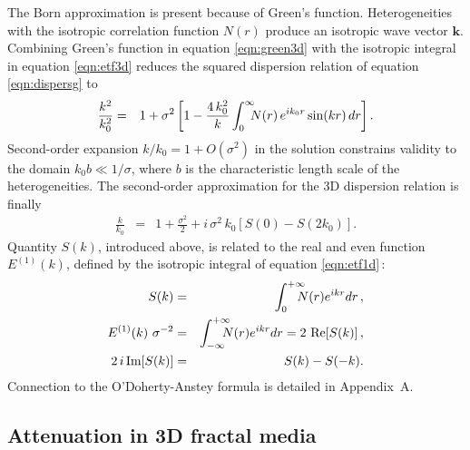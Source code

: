 The Born approximation is present because of Green's function.
Heterogeneities with the isotropic correlation function $N(r)$
produce an isotropic wave vector $\mathbf{k}$.
Combining Green's function in equation \ref{eqn:green3d} with the isotropic integral in equation \ref{eqn:etf3d} reduces 
the squared dispersion relation of equation \ref{eqn:dispersg} to
\begin{eqnarray}
\frac{k^2}{k_0^2} & = & 1 + \sigma^2\left[1 - \frac{4\,k_0^2}{k}\int_{0}^{\infty}\hspace{-2mm} N(r)\,e^{ik_0r}\sin(kr)\,dr\right].
\end{eqnarray}
Second-order expansion $k/k_0=1+O(\sigma^2)$ in the solution constrains validity to the domain 
$k_0b\ll 1/\sigma$, where $b$ is the characteristic length scale of the heterogeneities.
The second-order approximation for the 3D dispersion relation is finally
\begin{eqnarray}
\frac{k}{k_0} & = & 1 + \frac{\sigma^2}{2} + i\,\sigma^2\,k_0\left[S(0) - S(2k_0)\right]. \label{eqn:dispersc}
\end{eqnarray}
Quantity $S(k)$, introduced above, is related to the real and even function $E^{(1)}(k)$, defined by the isotropic integral of equation \ref{eqn:etf1d}\,:
\begin{eqnarray}
S(k) & = & \int_{0}^{+\infty}\hspace{-3mm}N(r)e^{ikr}dr\,, \label{eqn:defskint} \\
E^{(1)}(k)~\sigma^{-2} & = & \int_{-\infty}^{+\infty}\hspace{-3mm}N(r)e^{ikr}dr = 2~\mbox{Re}[S(k)]\,, \label{eqn:rsint} \\
2\,i\,\mbox{Im}[S(k)] & = & S(k) - S(-k).
\end{eqnarray}
Connection to the O'Doherty-Anstey formula is detailed in Appendix~A.


\subsection{Attenuation in 3D fractal media}


